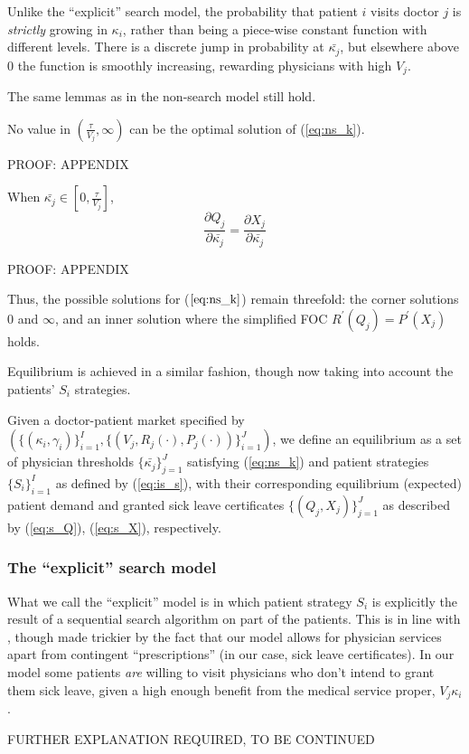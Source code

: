 \documentclass[../main.tex]{subfiles}
\begin{document}
Unlike the ``explicit'' search model, the probability that patient $i$ visits doctor $j$ is \textit{strictly} growing in $\kappa_i$, rather than being a piece-wise constant function with different levels. There is a discrete jump in probability at $\bar{\kappa_j}$, but elsewhere above $0$ the function is smoothly increasing, rewarding physicians with high $V_j$.

The same lemmas as in the non-search model still hold.


\begin{lemma}
\label{is_lemma}
No value in $(\frac{\tau}{V_j},\infty)$ can be the optimal solution of (\ref{eq:ns_k}).
\end{lemma}
    
    PROOF: APPENDIX
    
\begin{lemma}
\label{is_derivatives}
When $\bar{\kappa_j} \in [0,\frac{\tau}{V_j}]$,
\[
\frac{\partial Q_j}{\partial\bar{\kappa_j}} = \frac{\partial X_j}{\partial \bar{\kappa_j}}   
\]
\end{lemma}
    
PROOF: APPENDIX

Thus, the possible solutions for ($\ref{eq:ns_k}$) remain threefold: the corner solutions $0$ and $\infty$, and an inner solution where the simplified FOC $R^{\prime}(Q_j) = P^{\prime}(X_j)$ holds.

Equilibrium is achieved in a similar fashion, though now taking into account the patients' $S_i$ strategies.

\begin{equilibrium}
    \label{is_eq}
Given a doctor-patient market specified by \\ $(\{(\kappa_i,\gamma_i)\}_{i =1}^{I},\{(V_j,R_j(\cdot),P_j(\cdot))\}_{i =1}^{J})$, we define an equilibrium as a set of physician thresholds $\{\bar{\kappa_j}\}_{j =1}^{J}$ satisfying (\ref{eq:ns_k}) and patient strategies $\{S_i\}_{i =1}^{I}$ as defined by (\ref{eq:is_s}), with their corresponding equilibrium (expected) patient demand and granted sick leave certificates $\{(Q_j,X_j)\}_{j =1}^{J}$ as described by (\ref{eq:s_Q}), (\ref{eq:s_X}), respectively.
\end{equilibrium}

\subsubsection{The ``explicit'' search model}

What we call the ``explicit'' model is in which patient strategy $S_i$ is explicitly the result of a sequential search algorithm on part of the patients. This is in line with \cite{schnell2017physician}, though made trickier by the fact that our model allows for physician services apart from contingent ``prescriptions'' (in our case, sick leave certificates). In our model some patients \textit{are} willing to visit physicians who don't intend to grant them sick leave, given a high enough benefit from the medical service proper, $V_j \kappa_i$.

FURTHER EXPLANATION REQUIRED, TO BE CONTINUED
\end{document}
